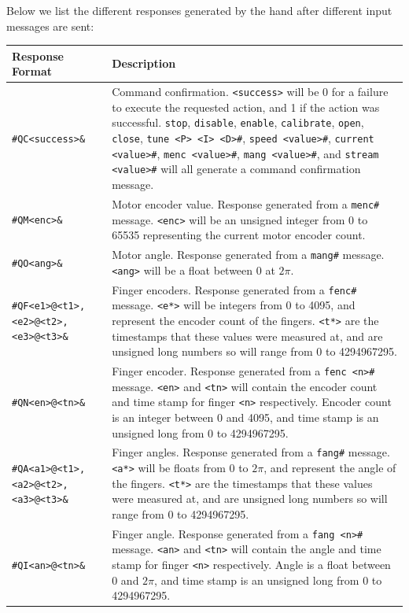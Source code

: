 \documentclass[letterpaper,notitlepage,10pt]{article}
\begin{document}
Below we list the different responses generated by the hand after different input messages are sent:\\

\begin{tabular}{l|p{}}
Response Format & Description \\
\hline
\verb;#QC<success>&; & Command confirmation. \verb;<success>; will be 0 for a failure to execute the requested action, and 1 if the action was successful. \verb;stop;, \verb;disable;, \verb;enable;, \verb;calibrate;, \verb;open;, \verb;close;, \verb;tune <P> <I> <D>#;, \verb;speed <value>#;, \verb;current <value>#;, \verb;menc <value>#;, \verb;mang <value>#;, and \verb;stream <value>#; will all generate a command confirmation message. \\

\verb;#QM<enc>&; & Motor encoder value. Response generated from a \verb;menc#; message. \verb;<enc>; will be an unsigned integer from 0 to 65535 representing the current motor encoder count. \\

\verb;#QO<ang>&; & Motor angle. Response generated from a \verb;mang#; message. \verb;<ang>; will be a float between 0 at $2\pi$. \\

\verb;#QF<e1>@<t1>,<e2>@<t2>,<e3>@<t3>&; & Finger encoders. Response generated from a \verb;fenc#; message. \verb;<e*>; will be integers from 0 to 4095, and represent the encoder count of the fingers. \verb;<t*>; are the timestamps that these values were measured at, and are unsigned long numbers so will range from 0 to 4294967295. \\

\verb;#QN<en>@<tn>&; & Finger encoder. Response generated from a \verb;fenc <n>#; message. \verb;<en>; and \verb;<tn>; will contain the encoder count and time stamp for finger \verb;<n>; respectively. Encoder count is an integer between 0 and 4095, and time stamp is an unsigned long from 0 to 4294967295. \\

\verb;#QA<a1>@<t1>,<a2>@<t2>,<a3>@<t3>&; & Finger angles. Response generated from a \verb;fang#; message. \verb;<a*>; will be floats from 0 to $2\pi$, and represent the angle of the fingers. \verb;<t*>; are the timestamps that these values were measured at, and are unsigned long numbers so will range from 0 to 4294967295. \\

\verb;#QI<an>@<tn>&; & Finger angle. Response generated from a \verb;fang <n>#; message. \verb;<an>; and \verb;<tn>; will contain the angle and time stamp for finger \verb;<n>; respectively. Angle is a float between 0 and $2\pi$, and time stamp is an unsigned long from 0 to 4294967295. \\


\end{tabular}
\end{document}

